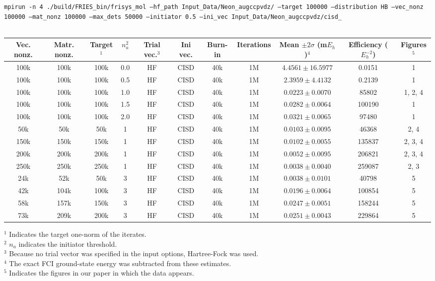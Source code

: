 \documentclass[12pt, landscape]{article}
\begin{document}
\texttt{mpirun -n 4 ./build/FRIES\_bin/frisys\_mol --hf\_path Input\_Data/Neon\_augccpvdz/ --target 100000 --distribution HB --vec\_nonz 100000 --mat\_nonz 100000 --max\_dets 50000 --initiator 0.5 --ini\_vec Input\_Data/Neon\_augccpvdz/cisd\_}
\\~\\
\begin{tabular}{c|c|c|c|c|c|c|c|c|c|c}
Vec. nonz. & Matr. nonz. & Target$^1$ & $n_a^2$ & Trial vec.$^3$ & Ini vec. & Burn-in & Iterations & Mean $\pm 2 \sigma$ (m$E_h$)$^4$ & Efficiency ($E_h^{-2}$) & Figures$^5$ \\ \hline
100k & 100k & 100k & 0.0 & HF & CISD & 40k & 1M & $4.4561 \pm 16.5977$ & 0.0151 & 1 \\
100k & 100k & 100k & 0.5 & HF & CISD  & 40k & 1M & $2.3959 \pm 4.4132$ & 0.2139 & 1 \\
100k & 100k & 100k & 1.0 & HF & CISD  & 40k & 1M & $0.0223 \pm 0.0070$ & 85802 & 1, 2, 4 \\
100k & 100k & 100k & 1.5 & HF & CISD  & 40k & 1M & $0.0282 \pm 0.0064$ & 100190 & 1 \\
100k & 100k & 100k & 2.0 & HF & CISD  & 40k & 1M & $0.0321 \pm 0.0065$ & 97480 & 1 \\
50k & 50k & 50k & 1 & HF & CISD &  40k & 1M & $0.0103 \pm 0.0095$ & 46368 & 2, 4 \\
150k & 150k & 150k & 1 & HF & CISD &  40k & 1M & $0.0102 \pm 0.0055$ & 135837 & 2, 3, 4 \\
200k & 200k & 200k & 1 & HF & CISD &  40k & 1M & $0.0052 \pm 0.0095$ & 206821 & 2, 3, 4 \\
250k & 250k & 250k & 1 & HF & CISD &  40k & 1M & $0.0038 \pm 0.0040$ & 259087 & 2, 3 \\
24k & 52k & 50k & 3 & HF & CISD & 40k & 1M & $0.0038 \pm 0.0101$ & 40798 & 5 \\
42k & 104k & 100k &  3 & HF & CISD & 40k & 1M & $ 0.0196 \pm 0.0064$ & 100854 & 5 \\
58k & 157k & 150k & 3 & HF & CISD & 40k & 1M & $0.0247 \pm 0.0051$ & 158244 & 5 \\
73k & 209k & 200k & 3 & HF & CISD & 40k & 1M & $0.0251 \pm 0.0043$ & 229864 & 5 \\
\end{tabular}
$^1$ Indicates the target one-norm of the iterates. \\
$^2$ $n_a$ indicates the initiator threshold. \\
$^3$ Because no trial vector was specified in the input options, Hartree-Fock was used.\\
$^4$ The exact FCI ground-state energy was subtracted from these estimates. \\
$^5$ Indicates the figures in our paper in which the data appears.
\end{document}
